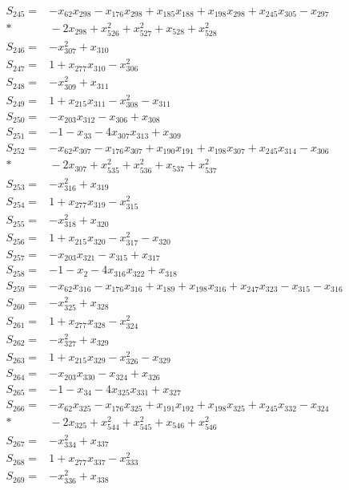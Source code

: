 \begin{align*}
S_{245}={}&-x_{62}x_{298}-x_{176}x_{298}+x_{185}x_{188}+x_{198}x_{298}+x_{245}x_{305}-x_{297}\\*
&{}-2x_{298}+x_{526}^{2}+x_{527}^{2}+x_{528}+x_{528}^{2}\\[3pt]
S_{246}={}&-x_{307}^{2}+x_{310}\\[3pt]
S_{247}={}&1+x_{277}x_{310}-x_{306}^{2}\\[3pt]
S_{248}={}&-x_{309}^{2}+x_{311}\\[3pt]
S_{249}={}&1+x_{215}x_{311}-x_{308}^{2}-x_{311}\\[3pt]
S_{250}={}&-x_{203}x_{312}-x_{306}+x_{308}\\[3pt]
S_{251}={}&-1-x_{33}-4x_{307}x_{313}+x_{309}\\[3pt]
S_{252}={}&-x_{62}x_{307}-x_{176}x_{307}+x_{190}x_{191}+x_{198}x_{307}+x_{245}x_{314}-x_{306}\\*
&{}-2x_{307}+x_{535}^{2}+x_{536}^{2}+x_{537}+x_{537}^{2}\\[3pt]
S_{253}={}&-x_{316}^{2}+x_{319}\\[3pt]
S_{254}={}&1+x_{277}x_{319}-x_{315}^{2}\\[3pt]
S_{255}={}&-x_{318}^{2}+x_{320}\\[3pt]
S_{256}={}&1+x_{215}x_{320}-x_{317}^{2}-x_{320}\\[3pt]
S_{257}={}&-x_{203}x_{321}-x_{315}+x_{317}\\[3pt]
S_{258}={}&-1-x_{2}-4x_{316}x_{322}+x_{318}\\[3pt]
S_{259}={}&-x_{62}x_{316}-x_{176}x_{316}+x_{189}+x_{198}x_{316}+x_{247}x_{323}-x_{315}-x_{316}\\[3pt]
S_{260}={}&-x_{325}^{2}+x_{328}\\[3pt]
S_{261}={}&1+x_{277}x_{328}-x_{324}^{2}\\[3pt]
S_{262}={}&-x_{327}^{2}+x_{329}\\[3pt]
S_{263}={}&1+x_{215}x_{329}-x_{326}^{2}-x_{329}\\[3pt]
S_{264}={}&-x_{203}x_{330}-x_{324}+x_{326}\\[3pt]
S_{265}={}&-1-x_{34}-4x_{325}x_{331}+x_{327}\\[3pt]
S_{266}={}&-x_{62}x_{325}-x_{176}x_{325}+x_{191}x_{192}+x_{198}x_{325}+x_{245}x_{332}-x_{324}\\*
&{}-2x_{325}+x_{544}^{2}+x_{545}^{2}+x_{546}+x_{546}^{2}\\[3pt]
S_{267}={}&-x_{334}^{2}+x_{337}\\[3pt]
S_{268}={}&1+x_{277}x_{337}-x_{333}^{2}\\[3pt]
S_{269}={}&-x_{336}^{2}+x_{338}\\[3pt]

\end{align*}
